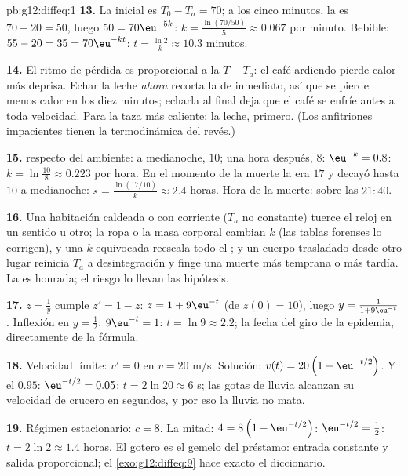 \begin{solution}{pb:g12:diffeq:1}
\textbf{13.} La  inicial es $T_0 - T_a = 70$; a los cinco
minutos, la  es $70 - 20 = 50$, luego $50 = 70\eu^{-5k}$:
$k = \frac{\ln(70/50)}{5} \approx 0.067$ por minuto. Bebible:
$55 - 20 = 35 = 70\eu^{-kt}$: $t = \frac{\ln 2}{k} \approx 10.3$ minutos.

\textbf{14.} El ritmo de pérdida es proporcional a la 
$T - T_a$: el café ardiendo pierde calor más deprisa. Echar la leche
\emph{ahora} recorta la  de inmediato, así que se pierde menos
calor en los diez minutos; echarla al final deja que el café se enfríe
antes a toda velocidad. Para la taza más caliente: la leche, primero. (Los
anfitriones impacientes tienen la termodinámica del revés.)

\textbf{15.}  respecto del ambiente: a medianoche, $10$; una
hora después, $8$: $\eu^{-k} = 0.8$:
$k = \ln\frac{10}{8} \approx 0.223$ por hora. En el momento de la muerte la
 era $17$ y decayó hasta $10$ a medianoche:
$s = \frac{\ln(17/10)}{k} \approx 2.4$ horas. Hora de la muerte: sobre las
$21{:}40$.

\textbf{16.} Una habitación caldeada o con corriente ($T_a$ no constante)
tuerce el reloj en un sentido u otro; la ropa o la masa corporal cambian
$k$ (las tablas forenses lo corrigen), y una $k$ equivocada reescala todo
el ; y un cuerpo trasladado desde otro lugar reinicia $T_a$ a
 desintegración y finge una muerte más temprana o más tardía. La
 es honrada; el riesgo lo llevan las hipótesis.

\textbf{17.} $z = \frac1y$ cumple $z' = 1 - z$: $z = 1 + 9\eu^{-t}$ (de
$z(0) = 10$), luego $y = \frac{1}{1 + 9\eu^{-t}}$. Inflexión en
$y = \frac12$: $9\eu^{-t} = 1$: $t = \ln 9 \approx 2.2$; la fecha del giro
de la epidemia, directamente de la fórmula.

\textbf{18.} Velocidad límite: $v' = 0$ en $v = 20$ m/s. Solución:
$v(t) = 20\left(1 - \eu^{-t/2}\right)$. Y el $0.95$:
$\eu^{-t/2} = 0.05$: $t = 2\ln 20 \approx 6$ s; las gotas de lluvia
alcanzan su velocidad de crucero en segundos, y por eso la lluvia no mata.

\textbf{19.} Régimen estacionario: $c = 8$. La mitad:
$4 = 8\left(1 - \eu^{-t/2}\right)$: $\eu^{-t/2} = \frac12$:
$t = 2\ln 2 \approx 1.4$ horas. El gotero es el gemelo  del
préstamo: entrada constante y salida proporcional; el
\cref{exo:g12:diffeq:9} hace exacto el diccionario.


\end{solution}
